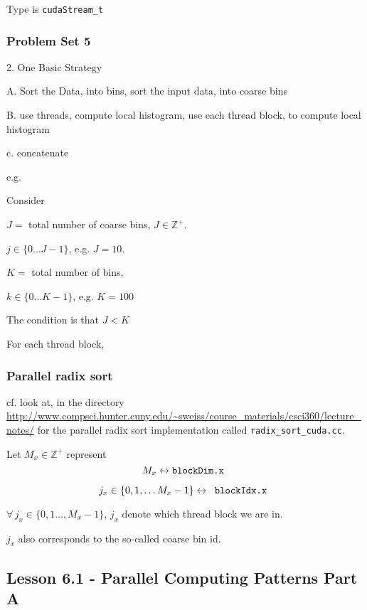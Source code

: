 \documentclass[10pt]{amsart}
\begin{document}
\begin{multicols*}{2}
Type is 
\verb|cudaStream_t|  

\subsubsection{Problem Set 5}

2. One Basic Strategy

A. Sort the Data, into bins, sort the input data, into coarse bins

B. use threads, compute local histogram, use each thread block, to compute local histogram

c. concatenate

e.g.

Consider

$J = $ total number of coarse bins, $J\in \mathbb{Z}^+$.

$j\in \lbrace 0 \dots J-1 \rbrace$, e.g. $J=10$.

$K = $ total number of bins,

$k\in \lbrace 0 \dots K-1 \rbrace$,  e.g. $K = 100$

The condition is that $J< K$

For each thread block,

\subsubsection{Parallel radix sort}

cf. look at, in the directory 
\url{http://www.compsci.hunter.cuny.edu/~sweiss/course_materials/csci360/lecture_notes/}
for the parallel radix sort implementation called \verb|radix_sort_cuda.cc|.

Let $M_x \in \mathbb{Z}^+$ represent
\begin{equation}
  M_x \leftrightarrow \verb|blockDim.x |
\end{equation}

\begin{equation}
  j_x \in \lbrace 0 , 1 , \dots M_x -1 \rbrace \leftrightarrow \verb| blockIdx.x |
\end{equation}

$\forall \, j_x \in \lbrace 0 , 1 \dots , M_x - 1\rbrace $, $j_x $ denote which thread block we are in.

$j_x$ also corresponds to the so-called coarse bin id.  


\subsection{Lesson 6.1 - Parallel Computing Patterns Part A}


\end{multicols*}
\end{document}
